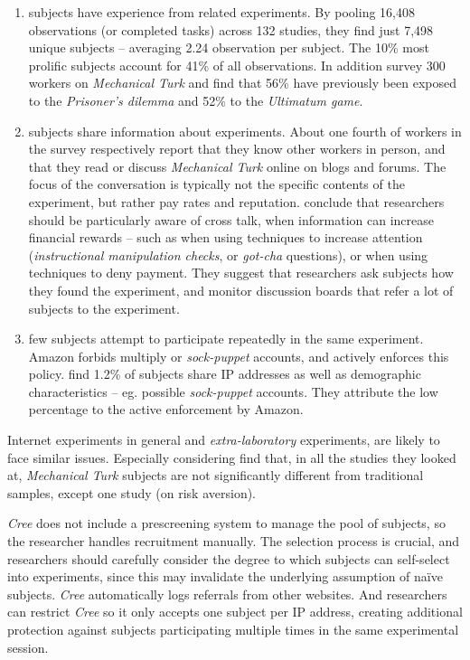 \documentclass[preprint, 12pt]{elsarticle}
\newcommand{\Cree}{\emph{Cree}\xspace}
\begin{document}
\begin{enumerate}
\item subjects have experience from related experiments. By pooling 16,408 observations (or completed tasks) across 132 studies, they find just 7,498 unique subjects -- averaging 2.24 observation per subject. The 10\% most prolific subjects account for 41\% of all observations. In addition \cite{Chandler_Mueller_Paolacci_2014} survey 300 workers on \emph{Mechanical Turk} and find that 56\% have previously been exposed to the \emph{Prisoner's dilemma} and 52\% to the \emph{Ultimatum game}. 
\item subjects share information about experiments. About one fourth of workers in the \cite{Chandler_Mueller_Paolacci_2014} survey respectively report that they know other workers in person, and that they read or discuss \emph{Mechanical Turk} online on blogs and forums. The focus of the conversation is typically not the specific contents of the experiment, but rather pay rates and reputation. \cite{Chandler_Mueller_Paolacci_2014} conclude that researchers should be particularly aware of cross talk, when information can increase financial rewards -- such as when using techniques to increase attention (\emph{instructional manipulation checks}, or \emph{got-cha} questions), or when using techniques to deny payment. They suggest that researchers ask subjects how they found the experiment, and monitor discussion boards that refer a lot of subjects to the experiment.
\item few subjects attempt to participate repeatedly in the same experiment. Amazon forbids multiply or \emph{sock-puppet} accounts, and actively enforces this policy. \cite{Chandler_Mueller_Paolacci_2014} find 1.2\% of subjects share IP addresses as well as demographic characteristics -- eg. possible \emph{sock-puppet} accounts. They attribute the low percentage to the active enforcement by Amazon.
\end{enumerate}

Internet experiments in general and \emph{extra-laboratory} experiments, are likely to face similar issues. Especially considering \citet*{Goodman_Cryder_Cheema_2013} find that, in all the studies they looked at, \emph{Mechanical Turk} subjects are not significantly different from traditional samples, except one study (on risk aversion).

\Cree does not include a prescreening system to manage the pool of subjects, so the researcher handles recruitment manually. The selection process is crucial, and researchers should carefully consider the degree to which subjects can self-select into experiments, since this may invalidate the underlying assumption of naïve subjects. \Cree automatically logs referrals from other websites. And researchers can restrict \Cree so it only accepts one subject per IP address, creating additional protection against subjects participating multiple times in the same experimental session.
\end{document}
